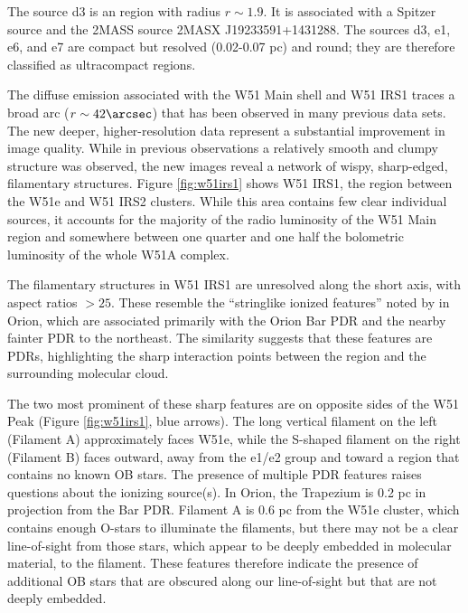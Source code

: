 The source d3 is an \hii region with radius $r\sim1.9$\arcsec.  It is
associated with a Spitzer source and the 2MASS source 2MASX J19233591+1431288.
The sources d3, e1, e6, and e7 are compact but resolved (0.02-0.07 pc) and
round; they are therefore classified as ultracompact \hii regions.

The diffuse emission associated with the W51 Main shell and W51 IRS1 traces a broad arc
($r\sim42\arcsec$) that has been observed in many previous data sets.  The new
deeper, higher-resolution data represent a substantial improvement in image
quality.  While in previous observations a relatively smooth and clumpy
structure was observed, the new images reveal a network of wispy, sharp-edged,
filamentary structures.  Figure \ref{fig:w51irs1} shows W51 IRS1, the
region between the W51e and
W51 IRS2 clusters.  While this area contains few clear individual sources, it
accounts for the majority of the radio luminosity of the W51 Main region and
somewhere between one quarter and one half the bolometric luminosity of the
whole W51A complex.

The filamentary structures in W51 IRS1 are unresolved along the short
axis, with aspect ratios $>25$.   These resemble the ``stringlike ionized
features'' noted by \citet[][see
\url{http://images.nrao.edu/402}]{Yusef-Zadeh1990a} in Orion, which are
associated primarily with the Orion Bar PDR and the nearby fainter PDR to the
northeast.  The similarity suggests that these features are PDRs, highlighting
the sharp interaction points between the \hii region and the surrounding
molecular cloud.

The two most prominent of these sharp features are on opposite sides of the W51
Peak (Figure \ref{fig:w51irs1}, blue arrows).  The long vertical filament
on the left (Filament A) approximately faces W51e, while the S-shaped filament
on the right (Filament B) faces outward, away from the e1/e2 group and toward a
region that contains no known OB stars.  The presence of multiple PDR features
raises questions about the ionizing source(s).  In Orion, the Trapezium is 0.2
pc in projection from the Bar PDR.  Filament A is 0.6 pc from the W51e cluster,
which contains enough O-stars to illuminate the filaments, but there may not be
a clear line-of-sight from those stars, which appear to be deeply embedded in
molecular material, to the filament.  These features therefore indicate the
presence of additional OB stars that are obscured along our line-of-sight but
that are not deeply embedded.

